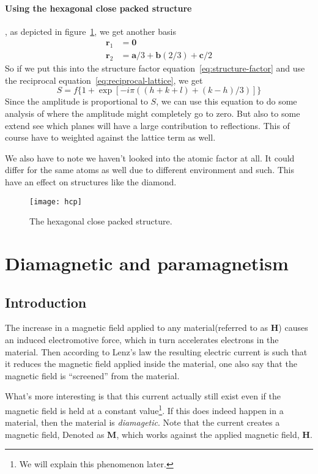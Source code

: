 \documentclass[11pt]{article}
\begin{document}
\newpage
\paragraph{Using the hexagonal close packed structure}, as depicted in figure~\ref{fig:hcp}, we get another basis 
\begin{align}
	\mathbf{r}_1 &= \mathbf{0} \\
	\mathbf{r}_2 &= \mathbf{a}/3+\mathbf{b}(2/3) + \mathbf{c}/2
\end{align}
So if we put this into the structure factor equation~\ref{eq:structure-factor} and use the reciprocal equation~\ref{eq:reciprocal-lattice}, we get
\begin{equation}
	S = f\{1+\exp{[-i\pi((h+k+l)+(k-h)/3)]}\}
\end{equation}
Since the amplitude is proportional to $S$, we can use this equation to do some analysis of where the amplitude might completely go to zero. But also to some extend see which planes will have a large contribution to reflections. This of course have to weighted against the lattice term as well.

We also have to note we haven't looked into the atomic factor at all. It could differ for the same atoms as well due to different environment and such. This have an effect on structures like the diamond.
\begin{figure}[!h]
	\centering
	\texttt{[image: hcp]}
	\caption{The hexagonal close packed structure.}
	\label{fig:hcp}
\end{figure}

\newpage
\section{Diamagnetic and paramagnetism}
\subsection{Introduction}
The increase in a magnetic field applied to any material(referred to as $\mathbf{H}$) causes an induced electromotive force, which in turn accelerates electrons in the material. Then according to Lenz's law the resulting electric current is such that it reduces the magnetic field applied inside the material, one also say that the magnetic field is ``screened'' from the material.

What's more interesting is that this current actually still exist even if the magnetic field is held at a constant value\footnote{We will explain this phenomenon later.}. If this does indeed happen in a material, then the material is \emph{diamagetic}. Note that the current creates a magnetic field, Denoted as $\mathbf{M}$, which works against the applied magnetic field, $\mathbf{H}$.
\end{document}
